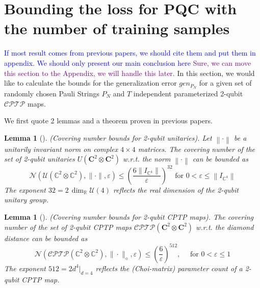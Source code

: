 \documentclass[%
 reprint,
superscriptaddress,
 amsmath,amssymb,
 aps,
]{revtex4-2}
\newcommand{\norm}[1]{\left\lVert#1\right\rVert}
\newtheorem{lemma}[theorem]{Lemma}
\newcommand{\yijian}[1]{\textcolor{blue}{#1}}
\newcommand{\simba}[1]{\textcolor{purple}{#1}}
\begin{document}
\section{Bounding the loss for PQC with the number of training samples}
\label{sec:Theoretical_Bounds}
\yijian{If most result comes from previous papers, we should cite them and put them in appendix. We should only present our main conclusion here}
\simba{Sure, we can move this section to the Appendix, we will handle this later.}
In this section, we would like to calculate the bounds for the generalization error $gen_{P_N}$ for a given set of randomly chosen Pauli Strings $P_N$ and $T$ independent parameterized 2-qubit $\mathcal{CPTP}$ maps.

We first quote 2 lemmas and a theorem proven in previous papers.

\begin{lemma}[\!\!\cite{caro2022generalization}]
    (Covering number bounds for 2-qubit unitaries). Let $\norm{\cdot}$ be a unitarily invariant norm on complex $4 \times 4$ matrices. The covering number of the set of 2-qubit unitaries $U(\mathbf{C}^2 \otimes \mathbf{C}^2)$ w.r.t. the norm $\norm{\cdot}$ can be bounded as
\begin{equation}
    \mathcal{N}\left(\mathcal{U}\left(\mathbb{C}^2 \otimes \mathbb{C}^2\right),\|\cdot\|, \varepsilon\right) \leqslant\left(\frac{6\left\|I_{\mathbb{C}^4}\right\|}{\varepsilon}\right)^{32}
    \text { for } 0<\varepsilon \leqslant\left\|I_{\mathbb{C}^4}\right\|
\end{equation}
The exponent $32 = 2\,\dim_{\mathbb{R}}\mathcal{U}(4)$ reflects the real dimension of the 2-qubit unitary group.
\end{lemma}

\begin{lemma}[\!\!\cite{caro2022generalization}]
    (Covering number bounds for 2-qubit CPTP maps). The covering number of the set of 2-qubit CPTP maps $\mathcal{CPTP}(\mathbf{C}^2 \otimes \mathbf{C}^2)$ w.r.t. the diamond distance can be bounded as
    \begin{equation}
    \mathcal{N}\left(\mathcal{CPTP}\left(\mathbb{C}^2 \otimes \mathbb{C}^2\right),\|\cdot\|_\diamond, \varepsilon\right) \leqslant\left(\frac{6}{\varepsilon}\right)^{512}, \quad \text { for } 0<\varepsilon \leqslant1
    \end{equation}
The exponent $512 = 2 d^{4}\big|_{d=4}$ reflects the (Choi-matrix) parameter count of a 2-qubit CPTP map.
\end{lemma}
\end{document}
